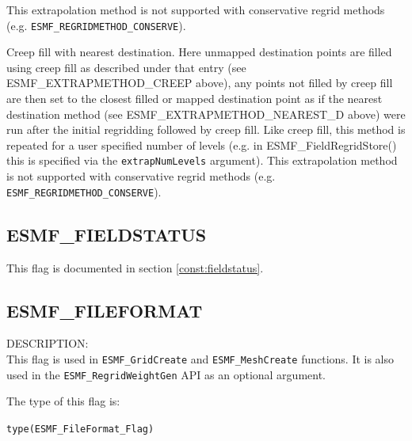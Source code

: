 \begin{description}
      This extrapolation method is not supported with conservative regrid methods 
      (e.g. {\tt ESMF\_REGRIDMETHOD\_CONSERVE}).
\item [ESMF\_EXTRAPMETHOD\_CREEP\_NRST\_D]
      Creep fill with nearest destination.
      Here unmapped destination points are filled using creep fill as described under that entry (see ESMF\_EXTRAPMETHOD\_CREEP above), any points not filled
      by creep fill are then set to the closest filled or mapped destination point as if the nearest destination method (see ESMF\_EXTRAPMETHOD\_NEAREST\_D above) 
      were run after the initial regridding followed by creep fill. 
      Like creep fill, this method is repeated for a user specified number of levels 
      (e.g. in ESMF\_FieldRegridStore() this is specified via the {\tt extrapNumLevels} argument).
      This extrapolation method is not supported with conservative regrid methods 
      (e.g. {\tt ESMF\_REGRIDMETHOD\_CONSERVE}).
\end{description}

\subsection{ESMF\_FIELDSTATUS}
This flag is documented in section \ref{const:fieldstatus}.

\subsection{ESMF\_FILEFORMAT}
\label{const:fileformatflag}
{\sf DESCRIPTION:\\}
This flag is used in {\tt ESMF\_GridCreate} and {\tt ESMF\_MeshCreate}
functions.  It is also used in the {\tt ESMF\_RegridWeightGen} API as an
optional argument.

The type of this flag is:

{\tt type(ESMF\_FileFormat\_Flag)}

